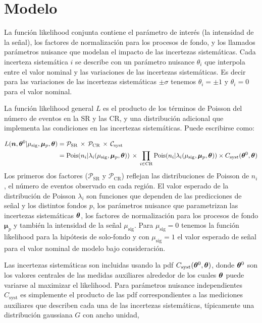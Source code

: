 \section{Modelo}

La función likelihood conjunta contiene el parámetro de interés (la intensidad de la señal),
los factores de normalización para los procesos de fondo, y los llamados parámetros nuisance que modelan
el impacto de las incertezas sistemáticas. Cada incerteza sistemática $i$ se describe con
un parámetro nuisance $\theta_i$ que interpola entre el valor nominal y las variaciones
de las incertezas sistemáticas. Es decir para las variaciones de las incertezas sistemáticas
$\pm \sigma$ tenemos $\theta_i = \pm 1$ y $\theta_i = 0$ para el valor nominal.

La función likelihood general $L$ es el producto de los términos de Poisson del número
de eventos en la SR y las CR, y una distribución adicional que implementa las
condiciones en las incertezas sistemáticas. Puede escribirse como:

\begin{align}
  L(\bm{n}, \bm{\theta}^0| \mu_\text{sig}, \bm{\mu}_p, \bm{\theta}) &= \mathcal{P}_\text{SR} \, \times \, \mathcal{P}_\text{CR} \, \times \, \mathcal{C}_\text{syst} \nonumber \\
  &= \operatorname{Pois}(n_i|\lambda_i(\mu_\text{sig}, \bm{\mu}_p, \bm{\theta})) \, \times \, \prod_{i \in \text{CR}} \operatorname{Pois}(n_i|\lambda_i(\mu_\text{sig}, \bm{\mu}_p, \bm{\theta})) \times C_\text{syst} (\bm{\theta}^0, \bm{\theta})
\end{align}
%
Los primeros dos factores ($\mathcal{P}_\text{SR}$ y $\mathcal{P}_\text{CR}$)
reflejan las distribuciones de Poisson de $n_i$, el número de
eventos observado en cada región. El valor esperado de la distribución de Poisson
$\lambda_i$ son funciones que dependen de las predicciones de señal y los distintos fondos $p$, los
parámetros nuisance que parametrizan las incertezas sistemáticas $\bm{\theta}$, los factores
de normalización para los procesos de fondo $\bm{\mu}_p$ y también la intensidad de la
señal $\mu_\text{sig}$. Para $\mu_\text{sig} = 0$ tenemos la función likelihood para
la hipótesis de solo-fondo y con $\mu_\text{sig} = 1$ el valor esperado de señal para el
valor nominal de modelo bajo consideración.

Las incertezas sistemáticas son incluidas usando la pdf $C_\text{syst}(\bm{\theta}^0, \bm{\theta})$,
donde $\bm{\theta}^0$ son los valores centrales de las medidas auxiliares alrededor de los
cuales $\bm{\theta}$ puede variarse al maximizar el likelihood. %
Para parámetros nuisance independientes $C_\text{syst}$ es simplemente el producto
de las pdf correspondientes a las mediciones auxiliares que describen cada una de las
incertezas sistemáticas, típicamente una distribución gaussiana $G$ con ancho unidad,

